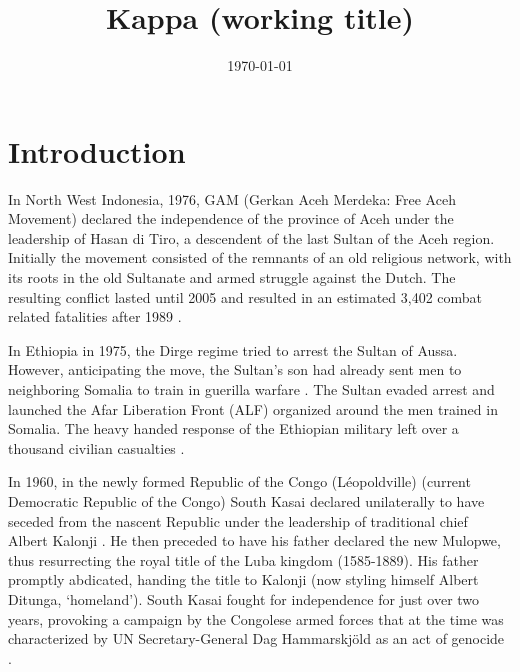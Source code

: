 \documentclass[12pt]{article}
\title{Kappa (working title)}
\author{}
\date{\today}
\begin{document}
\maketitle



\section{Introduction}


In North West Indonesia, 1976, GAM (Gerkan Aceh Merdeka: Free Aceh Movement)
declared the independence of the province of Aceh under the leadership of Hasan
di Tiro, a descendent of the last Sultan of the Aceh region. Initially the
movement consisted of the remnants of an old religious network, with its roots
in the old Sultanate and armed struggle against the Dutch. The resulting
conflict lasted until 2005 and resulted in an estimated 3,402 combat related
fatalities after 1989 \citep{Aspinall2009, Pettersson2018, Sundberg2013}.

In Ethiopia in 1975, the Dirge regime tried to arrest the Sultan of Aussa. However,
anticipating the move, the Sultan's son had already sent men to neighboring
Somalia to train in guerilla warfare \citep{Shehim1985}. The Sultan evaded
arrest and launched the Afar Liberation Front (ALF) organized around the men
trained in Somalia. The heavy handed response of the Ethiopian military left
over a thousand civilian casualties \citep{UCDPconflict363}.

In 1960, in the newly formed Republic of the Congo (Léopoldville) (current
Democratic Republic of the Congo) South Kasai declared unilaterally to have
seceded from the nascent Republic under the leadership of traditional chief
Albert Kalonji \citep{Nzongola2002}. He then preceded to have his father
declared the new Mulopwe, thus resurrecting the royal title of the Luba kingdom
(1585-1889). His father promptly abdicated, handing the title to Kalonji (now
styling himself Albert Ditunga, `homeland'). South Kasai fought for independence
for just over two years, provoking a campaign by the Congolese armed forces that
at the time was characterized by UN Secretary-General Dag Hammarskjöld as an act
of genocide \citep{Nzongola2002}.
\end{document}
